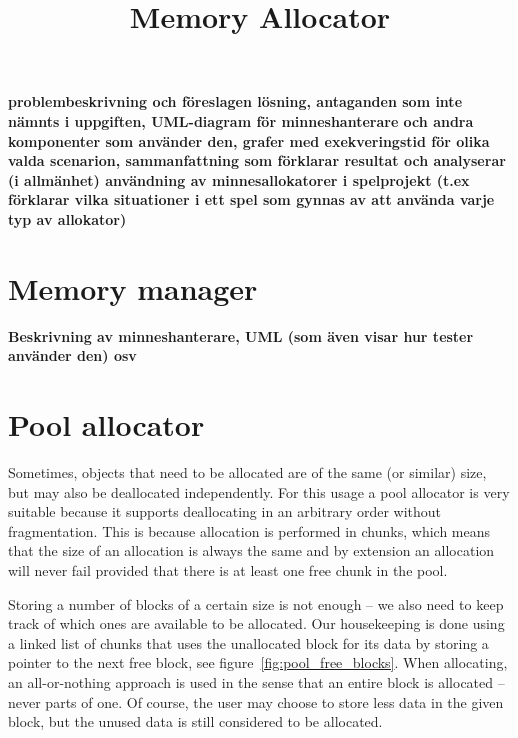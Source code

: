 \documentclass{article}
\title{Memory Allocator}
\begin{document}
\maketitle
\thispagestyle{empty}
\newpage

\tableofcontents
\thispagestyle{empty}
\newpage

\setcounter{page}{1}

\textbf{\large problembeskrivning och föreslagen lösning, antaganden som inte nämnts i uppgiften, UML-diagram för minneshanterare och andra komponenter som använder den, grafer med exekveringstid för olika valda scenarion, sammanfattning som förklarar resultat och analyserar (i allmänhet) användning av minnesallokatorer i spelprojekt (t.ex förklarar vilka situationer i ett spel som gynnas av att använda varje typ av allokator)}

\section{Memory manager}
\textbf{\large Beskrivning av minneshanterare, UML (som även visar hur tester använder den) osv}

\section{Pool allocator}
Sometimes, objects that need to be allocated are of the same (or similar) size, but may also be deallocated independently. For this usage a pool allocator is very suitable because it supports deallocating in an arbitrary order without fragmentation. This is because allocation is performed in chunks, which means that the size of an allocation is always the same and by extension an allocation will never fail provided that there is at least one free chunk in the pool.

Storing a number of blocks of a certain size is not enough -- we also need to keep track of which ones are available to be allocated. Our housekeeping is done using a linked list of chunks that uses the unallocated block for its data by storing a pointer to the next free block, see figure~\ref{fig:pool_free_blocks}. When allocating, an all-or-nothing approach is used in the sense that an entire block is allocated -- never parts of one. Of course, the user may choose to store less data in the given block, but the unused data is still considered to be allocated.
\end{document}
